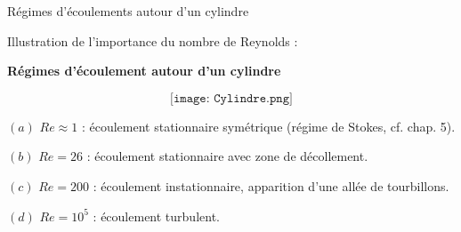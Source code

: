 \begin{frame}{Régimes d'écoulements autour d'un cylindre}

Illustration de l'importance du nombre de Reynolds :

\textbf{Régimes d'écoulement autour d'un cylindre}


\smallskip
$$
\texttt{[image: Cylindre.png]}
$$

$(a)$ \quad $Re\approx 1$ : écoulement stationnaire symétrique (régime de Stokes, cf. chap. 5).

$(b)$ \quad  $Re=26$ : écoulement stationnaire avec zone de décollement.

$(c)$ \quad $Re = 200$ : écoulement instationnaire, apparition d'une allée de tourbillons.

$(d)$ \quad $Re = 10^5$ : écoulement turbulent. 

\end{frame}


